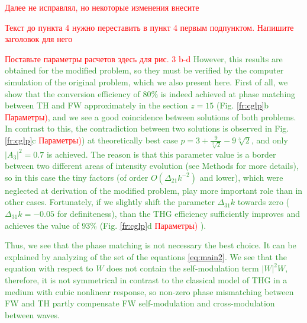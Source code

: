 \documentclass[a4paper, 12pt, onecolumn]{extarticle}
\begin{document}
\textcolor{red}
{Далее не исправлял, но некоторые изменения внесите}

\textcolor{red}
{Текст до пункта 4 нужно переставить в пункт 4 первым подпунктом. Напишите заголовок для него}

\textcolor{ForestGreen}
{ \textcolor{red}
{Поставьте параметры расчетов здесь для рис. 3 b-d }
However, this results are obtained for the modified problem, so they must be verified by the computer simulation of the original problem, which we also present here. First of all, we show that the conversion efficiency of $80\%$ is indeed achieved at phase matching between TH and FW approximately in the section $z=15$ (Fig. \ref{fr:cglp}b \textcolor{red}{ Параметры)}, and we see a good coincidence between solutions of both problems. In contrast to this, the contradiction between two solutions is observed in Fig. \ref{fr:cglp}c \textcolor{red}{ Параметры)}) at theoretically best case $p=3+ \frac{9}{\sqrt[3]{2}}-9\sqrt[3]{2}$, and only $|A_3|^2=0.7$ is achieved. The reason is that this parameter value is a border between two different areas of intensity evolution (see Methods for more details), so in this case the tiny factors (of order $O(\Delta_{21}k^{-2})$ and lower), which were neglected at derivation of the modified problem, play more important role than in other cases. Fortunately, if we slightly shift the parameter $\Delta_{31}k$ towards zero ($\Delta_{31}k=-0.05$ for definiteness), than the THG efficiency sufficiently improves and achieves the value of $93\%$ (Fig. \ref{fr:cglp}d\textcolor{red}{ Параметры)} ).
}

\textcolor{ForestGreen}
{
Thus, we see that the phase matching is not necessary the best choice. It can be explained by analyzing of the set of the equations \eqref{eq:main2}. We see that the equation with respect to $W$ does not contain the self-modulation term $|W|^2W$, therefore, it is not symmetrical in contrast to the classical model of THG in a medium with cubic nonlinear response, so non-zero phase mismatching between FW and TH partly compensate FW self-modulation and cross-modulation between waves.
}
\end{document}

